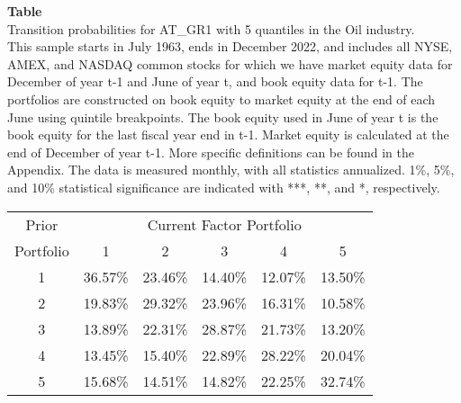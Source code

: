 \begin{table*}[ht!]
\raggedright
{}
\label{tab: transition_probs_AT_GR1_Oil_with_5_quantiles}
\textbf{Table \thetable} \\
Transition probabilities for AT_GR1 with 5 quantiles in the Oil industry. \\
\hspace*{1em}This sample starts in July 1963, ends in December 2022, and includes all NYSE, AMEX, and NASDAQ common stocks for which we have market equity data for December of year t-1 and June of year t, and book equity data for t-1. The portfolios are constructed on book equity to market equity at the end of each June using quintile breakpoints.  The book equity used in June of year t is the book equity for the last fiscal year end in t-1.  Market equity is calculated at the end of December of year t-1.  More specific definitions can be found in the Appendix.  The data is measured monthly, with all statistics annualized.  1\%, 5\%, and 10\% statistical significance are indicated with ***, **, and *, respectively. \\
\vspace{0.5em}
\centering
\begin{adjustbox}{max width=\textwidth}
\begin{tabular}{@{}cccccc@{}}
\toprule
Prior & \multicolumn{5}{c}{Current Factor Portfolio} \\
Portfolio & 1 & 2 & 3 & 4 & 5 \\
\midrule
1 & 36.57\% & 23.46\% & 14.40\% & 12.07\% & 13.50\% \\
2 & 19.83\% & 29.32\% & 23.96\% & 16.31\% & 10.58\% \\
3 & 13.89\% & 22.31\% & 28.87\% & 21.73\% & 13.20\% \\
4 & 13.45\% & 15.40\% & 22.89\% & 28.22\% & 20.04\% \\
5 & 15.68\% & 14.51\% & 14.82\% & 22.25\% & 32.74\% \\
\bottomrule
\end{tabular}
\end{adjustbox}
\end{table*}